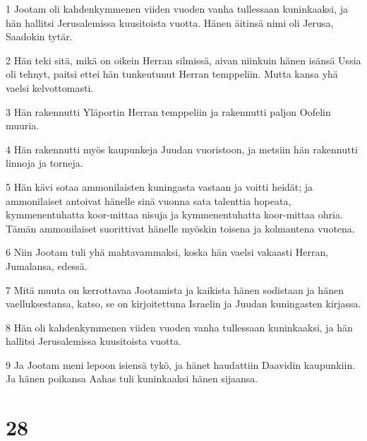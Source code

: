 \par 1 Jootam oli kahdenkymmenen viiden vuoden vanha tullessaan kuninkaaksi, ja hän hallitsi Jerusalemissa kuusitoista vuotta. Hänen äitinsä nimi oli Jerusa, Saadokin tytär.
\par 2 Hän teki sitä, mikä on oikein Herran silmissä, aivan niinkuin hänen isänsä Ussia oli tehnyt, paitsi ettei hän tunkeutunut Herran temppeliin. Mutta kansa yhä vaelsi kelvottomasti.
\par 3 Hän rakennutti Yläportin Herran temppeliin ja rakennutti paljon Oofelin muuria.
\par 4 Hän rakennutti myös kaupunkeja Juudan vuoristoon, ja metsiin hän rakennutti linnoja ja torneja.
\par 5 Hän kävi sotaa ammonilaisten kuningasta vastaan ja voitti heidät; ja ammonilaiset antoivat hänelle sinä vuonna sata talenttia hopeata, kymmenentuhatta koor-mittaa nisuja ja kymmenentuhatta koor-mittaa ohria. Tämän ammonilaiset suorittivat hänelle myöskin toisena ja kolmantena vuotena.
\par 6 Niin Jootam tuli yhä mahtavammaksi, koska hän vaelsi vakaasti Herran, Jumalansa, edessä.
\par 7 Mitä muuta on kerrottavaa Jootamista ja kaikista hänen sodistaan ja hänen vaelluksestansa, katso, se on kirjoitettuna Israelin ja Juudan kuningasten kirjassa.
\par 8 Hän oli kahdenkymmenen viiden vuoden vanha tullessaan kuninkaaksi, ja hän hallitsi Jerusalemissa kuusitoista vuotta.
\par 9 Ja Jootam meni lepoon isiensä tykö, ja hänet haudattiin Daavidin kaupunkiin. Ja hänen poikansa Aahas tuli kuninkaaksi hänen sijaansa.

\chapter{28}

